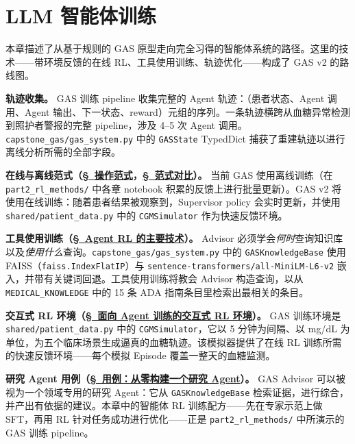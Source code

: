 \chapter{LLM 智能体训练}
\label{llm-agentic-training}

\begin{keybox}
本章描述了从基于规则的 GAS 原型走向完全习得的智能体系统的路径。这里的技术——带环境反馈的在线 RL、工具使用训练、轨迹优化——构成了 GAS v2 的路线图。

\textbf{轨迹收集。}
GAS 训练 pipeline 收集完整的 Agent 轨迹：（患者状态、Agent 调用、Agent 输出、下一状态、reward）元组的序列。一条轨迹横跨从血糖异常检测到照护者警报的完整 pipeline，涉及 4--5 次 Agent 调用。\texttt{capstone\_gas/gas\_system.py} 中的 \texttt{GASState} TypedDict 捕获了重建轨迹以进行离线分析所需的全部字段。

\textbf{在线与离线范式（\hyperref[operational-paradigms]{\S~操作范式}，\hyperref[paradigm-comparison]{\S~范式对比}）。}
当前 GAS 使用离线训练（在 \texttt{part2\_rl\_methods/} 中各章 notebook 积累的反馈上进行批量更新）。GAS v2 将使用在线训练：随着患者结果被观察到，Supervisor policy 会实时更新，并使用 \texttt{shared/patient\_data.py} 中的 \texttt{CGMSimulator} 作为快速反馈环境。

\textbf{工具使用训练（\hyperref[major-techniques-in-agentic-rl]{\S~Agent RL 的主要技术}）。}
Advisor 必须学会\emph{何时}查询知识库以及\emph{使用什么}查询。\texttt{capstone\_gas/gas\_system.py} 中的 \texttt{GASKnowledgeBase} 使用 FAISS（\texttt{faiss.IndexFlatIP}）与 \texttt{sentence-transformers/all-MiniLM-L6-v2} 嵌入，并带有关键词回退。工具使用训练将教会 Advisor 构造查询，以从 \texttt{MEDICAL\_KNOWLEDGE} 中的 15 条 ADA 指南条目里检索出最相关的条目。

\textbf{交互式 RL 环境（\hyperref[sec:interactive-rl-envs]{\S~面向 Agent 训练的交互式 RL 环境}）。}
GAS 训练环境是 \texttt{shared/patient\_data.py} 中的 \texttt{CGMSimulator}，它以 5 分钟为间隔、以 mg/dL 为单位，为五个临床场景生成逼真的血糖轨迹。该模拟器提供了在线 RL 训练所需的快速反馈环境——每个模拟 Episode 覆盖一整天的血糖监测。

\textbf{研究 Agent 用例（\hyperref[use-case-building-a-research-agent-from-scratch]{\S~用例：从零构建一个研究 Agent}）。}
GAS Advisor 可以被视为一个领域专用的研究 Agent：它从 \texttt{GASKnowledgeBase} 检索证据，进行综合，并产出有依据的建议。本章中的智能体 RL 训练配方——先在专家示范上做 SFT，再用 RL 针对任务成功进行优化——正是 \texttt{part2\_rl\_methods/} 中所演示的 GAS 训练 pipeline。
\end{keybox}

